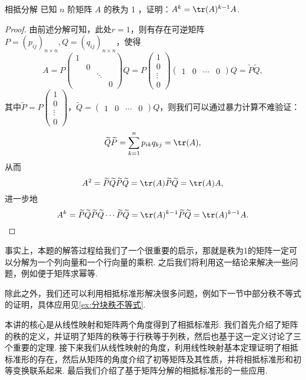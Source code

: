 \begin{example}{}{相抵分解}
    已知 $n$ 阶矩阵 $A$ 的秩为 1 ，证明：$A^k=\tr(A)^{k-1}A$.
\end{example}

\begin{proof}
    由前述分解可知，此处$r=1$，则有存在可逆矩阵 $P=(p_{ij})_{n \times n},Q=(q_{ij})_{n \times n}$，使得
    \[A=P\begin{pmatrix}
            1 &   &        &   \\
              & 0 &        &   \\
              &   & \ddots &   \\
              &   &        & 0
        \end{pmatrix} Q=P\begin{pmatrix}
            1 \\ 0 \\ \vdots \\ 0
        \end{pmatrix}\begin{pmatrix}
            1 & 0 & \cdots & 0
        \end{pmatrix} Q=\widetilde{P} \widetilde{Q},\]
    其中$\widetilde{P}=P\begin{pmatrix}
            1 \\ 0 \\ \vdots \\ 0
        \end{pmatrix}$，$\widetilde{Q}=\begin{pmatrix}
            1 & 0 & \cdots & 0
        \end{pmatrix} Q$，则我们可以通过暴力计算不难验证：
    \[\widetilde{Q} \widetilde{P}=\sum_{k=1}^{n} p_{i k} q_{k j}=\tr(A),\]
    从而
    \[A^{2}=\widetilde{P} \widetilde{Q} \widetilde{P} \widetilde{Q}=\tr(A) \widetilde{P} \widetilde{Q}=\tr(A) A,\]
    进一步地
    \[A^{k}=\widetilde{P} \widetilde{Q} \widetilde{P} \widetilde{Q} \cdots \widetilde{P} \widetilde{Q}=\tr(A)^{k-1} \widetilde{P} \widetilde{Q}=\tr(A)^{k-1} A.\]
\end{proof}

事实上，本题的解答过程给我们了一个很重要的启示，那就是秩为1的矩阵一定可以分解为一个列向量和一个行向量的乘积. 之后我们将利用这一结论来解决一些问题，例如便于矩阵求幂等.

除此之外，我们还可以利用相抵标准形解决很多问题，例如下一节中部分秩不等式的证明，具体应用见\autoref{ex:分块秩不等式}.

\begin{summary}

    本讲的核心是从线性映射和矩阵两个角度得到了相抵标准形. 我们首先介绍了矩阵的秩的定义，并证明了矩阵的秩等于行秩等于列秩，然后也基于这一定义讨论了三个重要的定理. 接下来我们从线性映射的角度，利用线性映射基本定理证明了相抵标准形的存在，然后从矩阵的角度介绍了初等矩阵及其性质，并将相抵标准形和初等变换联系起来. 最后我们介绍了基于矩阵分解的相抵标准形的一些应用.

\end{summary}

